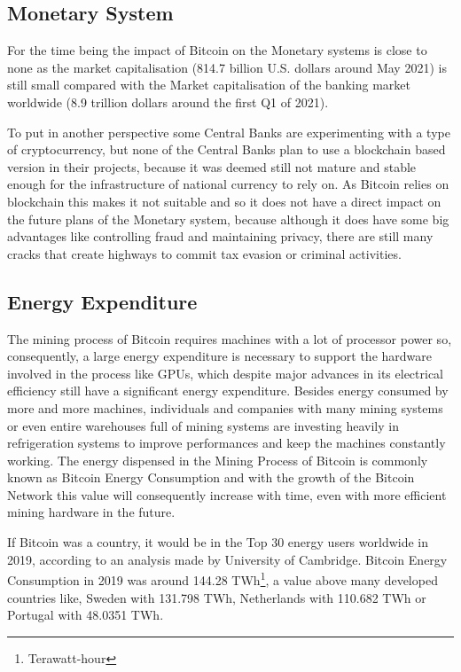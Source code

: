 \documentclass{article}
\newcommand\tab[1][1cm]{\hspace*{#1}}
\begin{document}
\subsection{Monetary System}

\tab For the time being the impact of Bitcoin on the Monetary systems is close to none as the market capitalisation (814.7 billion U.S. dollars around May 2021) is still small compared with the Market capitalisation of the banking market worldwide (8.9 trillion dollars around the first Q1 of 2021).

To put in another perspective some Central Banks are experimenting with a type of cryptocurrency, but none of the Central Banks plan to use a blockchain based version in their projects, because it was deemed still not mature and stable enough for the infrastructure of national currency to rely on. As Bitcoin relies on blockchain this makes it not suitable and so it does not have a direct impact on the future plans of the Monetary system, because although it does have some big advantages like controlling fraud and maintaining privacy, there are still many cracks that create highways to commit tax evasion or criminal activities.

\subsection{Energy Expenditure}

\tab The mining process of Bitcoin requires machines with a lot of processor power so, consequently, a large energy expenditure is necessary to support the hardware involved in the process like GPUs, which despite major advances in its electrical efficiency still have a significant energy expenditure. Besides energy consumed by more and more machines, individuals and companies with many mining systems or even entire warehouses full of mining systems are investing heavily in refrigeration systems to improve performances and keep the machines constantly working. The energy dispensed in the Mining Process of Bitcoin is commonly known as Bitcoin Energy Consumption and with the growth of the Bitcoin Network this value will consequently increase with time, even with more efficient mining hardware in the future.

If Bitcoin was a country, it would be in the Top 30 energy users worldwide in 2019, according to an analysis made by University of Cambridge. Bitcoin Energy Consumption in 2019 was around 144.28 TWh\footnote{Terawatt-hour}, a value above many developed countries like, Sweden with 131.798 TWh, Netherlands with 110.682 TWh or Portugal with 48.0351 TWh.
\end{document}
